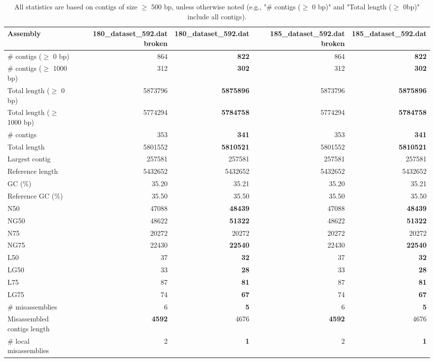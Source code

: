 \documentclass[12pt,a4paper]{article}
\begin{document}
\begin{table}[ht]
\begin{center}
\caption{All statistics are based on contigs of size $\geq$ 500 bp, unless otherwise noted (e.g., "\# contigs ($\geq$ 0 bp)" and "Total length ($\geq$ 0bp)" include all contigs).}
\begin{tabular}{|l*{4}{|r}|}
\hline
Assembly & 180\_dataset\_592.dat broken & 180\_dataset\_592.dat & 185\_dataset\_592.dat broken & 185\_dataset\_592.dat \\ \hline
\# contigs ($\geq$ 0 bp) & 864 & {\bf 822} & 864 & {\bf 822} \\ \hline
\# contigs ($\geq$ 1000 bp) & 312 & {\bf 302} & 312 & {\bf 302} \\ \hline
Total length ($\geq$ 0 bp) & 5873796 & {\bf 5875896} & 5873796 & {\bf 5875896} \\ \hline
Total length ($\geq$ 1000 bp) & 5774294 & {\bf 5784758} & 5774294 & {\bf 5784758} \\ \hline
\# contigs & 353 & {\bf 341} & 353 & {\bf 341} \\ \hline
Total length & 5801552 & {\bf 5810521} & 5801552 & {\bf 5810521} \\ \hline
Largest contig & 257581 & 257581 & 257581 & 257581 \\ \hline
Reference length & 5432652 & 5432652 & 5432652 & 5432652 \\ \hline
GC (\%) & 35.20 & 35.21 & 35.20 & 35.21 \\ \hline
Reference GC (\%) & 35.50 & 35.50 & 35.50 & 35.50 \\ \hline
N50 & 47088 & {\bf 48439} & 47088 & {\bf 48439} \\ \hline
NG50 & 48622 & {\bf 51322} & 48622 & {\bf 51322} \\ \hline
N75 & 20272 & 20272 & 20272 & 20272 \\ \hline
NG75 & 22430 & {\bf 22540} & 22430 & {\bf 22540} \\ \hline
L50 & 37 & {\bf 32} & 37 & {\bf 32} \\ \hline
LG50 & 33 & {\bf 28} & 33 & {\bf 28} \\ \hline
L75 & 87 & {\bf 81} & 87 & {\bf 81} \\ \hline
LG75 & 74 & {\bf 67} & 74 & {\bf 67} \\ \hline
\# misassemblies & 6 & {\bf 5} & 6 & {\bf 5} \\ \hline
Misassembled contigs length & {\bf 4592} & 4676 & {\bf 4592} & 4676 \\ \hline
\# local misassemblies & 2 & {\bf 1} & 2 & {\bf 1} \\ \hline

\end{tabular}
\end{center}
\end{table}
\end{document}
